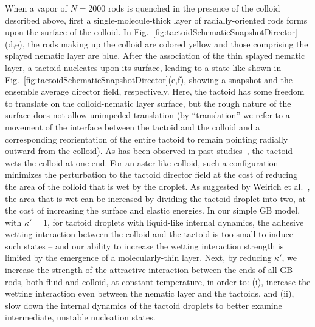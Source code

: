 \documentclass[%
 aip,
 amsmath,amssymb,
 reprint,%
]{revtex4-1}
\begin{document}
When a vapor of $N=2000$ rods is quenched in the presence of the colloid described above, first a single-molecule-thick layer of radially-oriented rods forms upon the surface of the colloid. In Fig.~\ref{fig:tactoidSchematicSnapshotDirector}(d,e), the rods making up the colloid are colored yellow and those comprising the splayed nematic layer are blue. After the association of the thin splayed nematic layer, a tactoid nucleates upon its surface, leading to a state like shown in Fig.~\ref{fig:tactoidSchematicSnapshotDirector}(e,f), showing a snapshot and the ensemble average director field, respectively. Here, the tactoid has some freedom to translate on the colloid-nematic layer surface, but the rough nature of the surface does not allow unimpeded translation (by ``translation'' we refer to a movement of the interface between the tactoid and the colloid and a corresponding reorientation of the entire tactoid to remain pointing radially outward from the colloid). As has been observed in past studies~\cite{Abbott13,Whitmer13,Abbott14,Rahimi2015}, the tactoid wets the colloid at one end. For an aster-like colloid, such a configuration minimizes the perturbation to the tactoid director field at the cost of reducing the area of the colloid that is wet by the droplet. As suggested by Weirich et al.~\cite{Weirich19}, the area that is wet can be increased by dividing the tactoid droplet into two, at the cost of increasing the surface and elastic energies. In our simple GB model, with $\kappa' = 1$, for tactoid droplets with liquid-like internal dynamics, the adhesive wetting interaction between the colloid and the tactoid is too small to induce such states -- and our ability to increase the wetting interaction strength is limited by the emergence of a molecularly-thin layer. Next, by reducing $\kappa'$, we increase the strength of the attractive interaction between the ends of all GB rods, both fluid and colloid, at constant temperature, in order to: (i), increase the wetting interaction even between the nematic layer and the tactoids, and (ii), slow down the internal dynamics of the tactoid droplets to better examine intermediate, unstable nucleation states.
\end{document}
